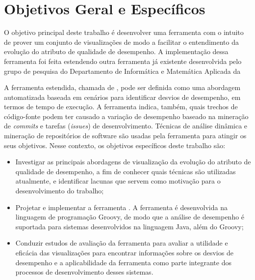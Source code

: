 
\section{Objetivos Geral e Específicos} \label{sec:objetivos-gerais-especificos}

O objetivo principal deste trabalho é desenvolver uma ferramenta com o intuito de prover um conjunto de visualizações de modo a facilitar o entendimento da evolução do atributo de qualidade de desempenho. A implementação dessa ferramenta foi feita estendendo outra ferramenta já existente desenvolvida pelo grupo de pesquisa do Departamento de Informática e Matemática Aplicada da 

A ferramenta estendida, chamada de \textit{\perfMinerName} \cite{Pinto2015}, pode ser definida como uma abordagem automatizada baseada em cenários para identificar desvios de desempenho, em termos de tempo de execução. A ferramenta indica, também, quais trechos de código-fonte podem ter causado a variação de desempenho baseado na mineração de \textit{commits} e tarefas (\textit{issues}) de desenvolvimento. Técnicas de análise dinâmica e mineração de repositórios de software são usadas pela ferramenta para atingir os seus objetivos. Nesse contexto, os objetivos específicos deste trabalho são:
\begin{itemize}
	\item Investigar as principais abordagens de visualização da evolução do atributo de qualidade de desempenho, a fim de conhecer quais técnicas são utilizadas atualmente, e identificar lacunas que servem como motivação para o desenvolvimento do trabalho;
	\item Projetar e implementar a ferramenta \textit{{\toolName}}. A ferramenta é desenvolvida na linguagem de programação Groovy, de modo que a análise de desempenho é suportada para sistemas desenvolvidos na linguagem Java, além do Groovy;
	\item Conduzir estudos de avaliação da ferramenta para avaliar a utilidade e eficácia das visualizações para encontrar informações sobre os desvios de desempenho e a aplicabilidade da ferramenta como parte integrante dos processos de desenvolvimento desses sistemas.
\end{itemize}

